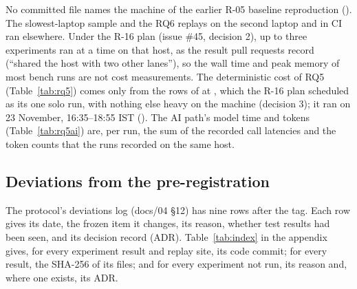 No committed file names the machine of the earlier R-05 baseline reproduction ().
The slowest-laptop sample and the RQ6 replays on the second laptop and in CI ran elsewhere.
Under the R-16 plan (issue \#45, decision 2), up to three experiments ran at a time on that host, as the result pull requests record (``shared the host with two other lanes''), so the wall time and peak memory of most bench runs are not cost measurements.
The deterministic cost of RQ5 (Table~\ref{tab:rq5}) comes only from the  rows of  at , which the R-16 plan scheduled as its one solo run, with nothing else heavy on the machine (decision 3); it ran on 23 November, 16:35--18:55 IST ().
The AI path's model time and tokens (Table~\ref{tab:rq5ai}) are, per run, the sum of the recorded call latencies and the token counts that the  runs recorded on the same host.

\subsection{Deviations from the pre-registration}
\label{sec:deviations}

The protocol's deviations log (docs/04 §12) has nine rows after the tag.
Each row gives its date, the frozen item it changes, its reason, whether test results had been seen, and its decision record (ADR).
Table~\ref{tab:index} in the appendix gives, for every experiment result and replay site, its code commit; for every result, the SHA-256 of its files; and for every experiment not run, its reason and, where one exists, its ADR.

